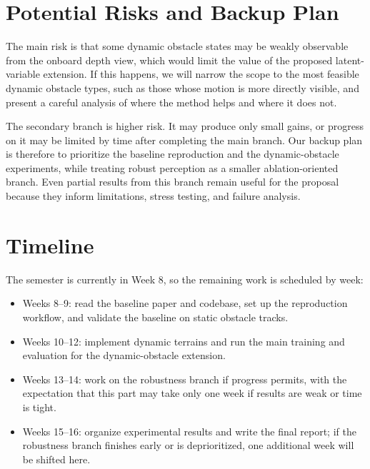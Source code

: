 \documentclass[conference]{IEEEtran}
\begin{document}
\section{Potential Risks and Backup Plan}
The main risk is that some dynamic obstacle states may be weakly observable from the onboard depth view, which would limit the value of the proposed latent-variable extension. If this happens, we will narrow the scope to the most feasible dynamic obstacle types, such as those whose motion is more directly visible, and present a careful analysis of where the method helps and where it does not.

The secondary branch is higher risk. It may produce only small gains, or progress on it may be limited by time after completing the main branch. Our backup plan is therefore to prioritize the baseline reproduction and the dynamic-obstacle experiments, while treating robust perception as a smaller ablation-oriented branch. Even partial results from this branch remain useful for the proposal because they inform limitations, stress testing, and failure analysis.

\section{Timeline}
The semester is currently in Week 8, so the remaining work is scheduled by week:
\begin{itemize}
   \setlength{\itemsep}{0.15em}
   \item Weeks 8--9: read the baseline paper and codebase, set up the reproduction workflow, and validate the baseline on static obstacle tracks.
   \item Weeks 10--12: implement dynamic terrains and run the main training and evaluation for the dynamic-obstacle extension.
   \item Weeks 13--14: work on the robustness branch if progress permits, with the expectation that this part may take only one week if results are weak or time is tight.
   \item Weeks 15--16: organize experimental results and write the final report; if the robustness branch finishes early or is deprioritized, one additional week will be shifted here.
\end{itemize}



\end{document}
